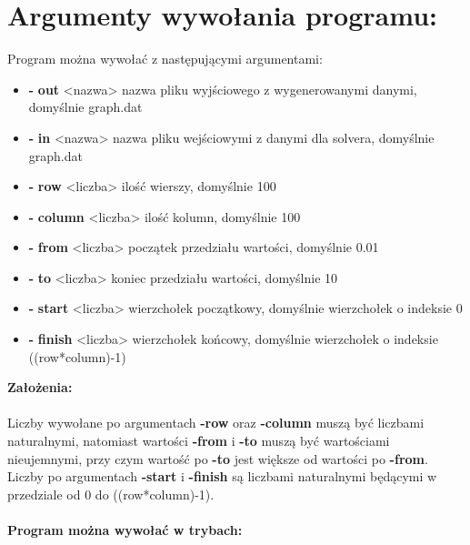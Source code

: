 \documentclass[polish, 12pt, a4paper]{article}
\begin{document}
\section {Argumenty wywołania programu: }
Program można wywołać z następującymi argumentami:
\begin {itemize}
    \item[\textbf{-}] \textbf{out} <nazwa> nazwa pliku wyjściowego z wygenerowanymi danymi, domyślnie graph.dat
    \item[\textbf{-}] \textbf{in} <nazwa>  nazwa pliku wejściowymi z danymi dla solvera, domyślnie graph.dat
    \item[\textbf{-}] \textbf{row} <liczba> ilość wierszy, domyślnie 100 
    \item[\textbf{-}] \textbf{column} <liczba> ilość kolumn, domyślnie 100
    \item[\textbf{-}] \textbf{from} <liczba> początek przedziału wartości, domyślnie 0.01
    \item[\textbf{-}] \textbf{to} <liczba> koniec przedziału wartości, domyślnie 10
    \item[\textbf{-}] \textbf{start} <liczba> wierzchołek początkowy, domyślnie wierzchołek o indeksie 0
    \item[\textbf{-}] \textbf{finish} <liczba> wierzchołek końcowy, domyślnie wierzchołek o indeksie ((row*column)-1)
\end {itemize}
\textbf{\large{Założenia:}} \\ \\ Liczby wywołane po argumentach \textbf{-row} oraz \textbf{-column} muszą być liczbami naturalnymi, natomiast wartości \textbf{-from} i \textbf{-to} muszą być wartościami nieujemnymi, przy czym wartość po \textbf{-to} jest większe od wartości po \textbf{-from}. Liczby po argumentach \textbf{-start} i \textbf{-finish} są liczbami naturalnymi będącymi w przedziale od 0 do ((row*column)-1).
\\
\\
\textbf{\large{Program można wywołać w trybach:}}
\end{document}
